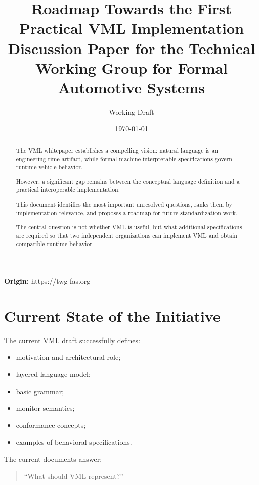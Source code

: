 \documentclass[a4paper,11pt]{article}
\title{
Roadmap Towards the First Practical VML Implementation\\
Discussion Paper for the Technical Working Group for Formal Automotive Systems
}
\author{Working Draft}
\date{\today}
\begin{document}
\maketitle
\begin{center}
\textbf{Origin:} https://twg-fas.org
\end{center}

\begin{abstract}
The VML whitepaper establishes a compelling vision:
natural language is an engineering-time artifact,
while formal machine-interpretable specifications
govern runtime vehicle behavior.

However, a significant gap remains between the conceptual
language definition and a practical interoperable implementation.

This document identifies the most important unresolved questions,
ranks them by implementation relevance,
and proposes a roadmap for future standardization work.

The central question is not whether VML is useful,
but what additional specifications are required so that
two independent organizations can implement VML and obtain
compatible runtime behavior.
\end{abstract}

\tableofcontents

\newpage

\section{Current State of the Initiative}

The current VML draft successfully defines:

\begin{itemize}
\item motivation and architectural role;
\item layered language model;
\item basic grammar;
\item monitor semantics;
\item conformance concepts;
\item examples of behavioral specifications.
\end{itemize}

The current documents answer:

\begin{quote}
``What should VML represent?''
\end{quote}
\end{document}
